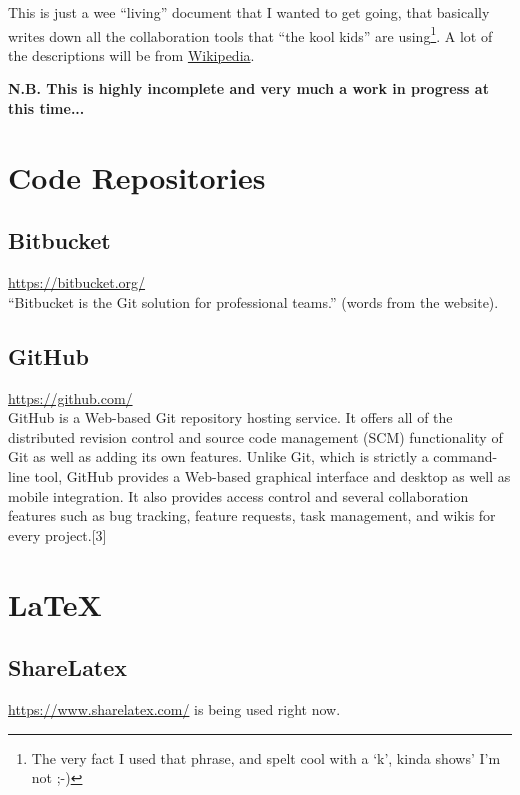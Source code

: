 \documentclass{article}
\date{today}
\begin{document}
\pagestyle{fancy}

\noindent
This is just a wee ``living'' document that I wanted to get going, that basically writes down all the collaboration tools that ``the kool kids'' are using\footnote{The very fact I used that phrase, and spelt cool with a `k', kinda shows' I'm not ;-)}.  
A lot of the descriptions will be from 
\href{https://en.wikipedia.org/wiki/Main_Page}{Wikipedia}.

\noindent
\bf{N.B. This is highly incomplete and very much a work in progress at this time...}



\section{Code Repositories}

\subsection{Bitbucket}
\href{https://bitbucket.org/}{https://bitbucket.org/}\\
``Bitbucket is the Git solution for professional teams.'' 
(words from the website). 

\subsection{GitHub}
\href{https://github.com/}{https://github.com/} \\
GitHub is a Web-based Git repository hosting service. It offers all of the distributed revision control and source code management (SCM) functionality of Git as well as adding its own features. Unlike Git, which is strictly a command-line tool, GitHub provides a Web-based graphical interface and desktop as well as mobile integration. It also provides access control and several collaboration features such as bug tracking, feature requests, task management, and wikis for every project.[3]

\section{LaTeX}
\subsection{ShareLatex}
\href{https://www.sharelatex.com/}{https://www.sharelatex.com/} is being used right now. 
\end{document}
